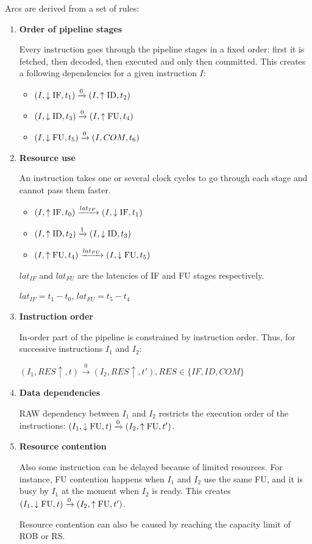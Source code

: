 Arcs are derived from a set of rules:
\begin{enumerate}
    \item \textbf{Order of pipeline stages}
    
    Every instruction goes through the pipeline stages in a fixed order: first it is fetched, then decoded, then executed and only then committed. This creates a following dependencies for a given instruction $I$:

    \begin{itemize}
        \item $(I, \downarrow\mathrm{IF}, t_1) \xrightarrow{0} (I, \uparrow\mathrm{ID}, t_2)$
        \item $(I, \downarrow\mathrm{ID}, t_3) \xrightarrow{0} (I, \uparrow\mathrm{FU}, t_4)$
        \item $(I, \downarrow\mathrm{FU}, t_5)  \xrightarrow{0} (I, COM, t_6)$
    \end{itemize}

    \item \textbf{Resource use}

    An instruction takes one or several clock cycles to go through each stage and cannot pass them faster.

    \begin{itemize}
        \item $(I, \uparrow\mathrm{IF}, t_0) \xrightarrow{lat_{IF}} (I, \downarrow\mathrm{IF}, t_1)$
        \item $(I, \uparrow\mathrm{ID}, t_2) \xrightarrow{1} (I, \downarrow\mathrm{ID}, t_3)$
        \item $(I, \uparrow\mathrm{FU}, t_4)  \xrightarrow{lat_{FU}} (I, \downarrow\mathrm{FU}, t_5)$
    \end{itemize}

    $lat_{IF}$ and $lat_{FU}$ are the latencies of IF and FU stages respectively.

    $lat_{IF} = t_1 - t_0$, $lat_{FU} = t_5 - t_4$

    \item \textbf{Instruction order}
    
    In-order part of the pipeline is constrained by instruction order. Thus, for successive instructions $I_1$ and $I_2$:

    $(I_1, RES\uparrow, t) \xrightarrow{0} (I_2, RES\uparrow, t'), RES \in \{IF, ID, COM\}$


    \item \textbf{Data dependencies}
    
    RAW dependency between $I_1$ and $I_2$ restricts the execution order of the instructions:  $(I_1, \downarrow\mathrm{FU}, t) \xrightarrow{0} (I_2, \uparrow\mathrm{FU}, t')$.
    
    \item \textbf{Resource contention}
    
    Also some instruction can be delayed because of limited resources. For instance, FU contention happens when $I_1$ and $I_2$ use the same FU, and it is busy by $I_1$ at the moment when $I_2$ is ready. This creates $(I_1, \downarrow\mathrm{FU}, t) \xrightarrow{0} (I_2, \uparrow\mathrm{FU}, t')$. 

    Resource contention can also be caused by reaching the capacity limit of ROB or RS. 
\end{enumerate}

